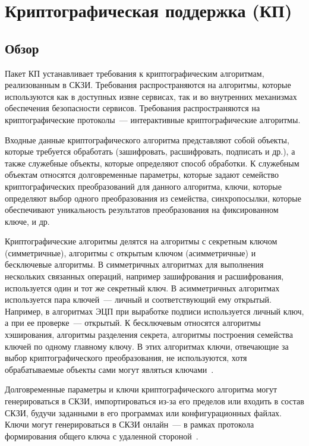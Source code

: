 \section{Криптографическая поддержка (КП)}\label{CS}

\subsection{Обзор}\label{CS.Intro}

Пакет КП устанавливает требования к криптографическим алгоритмам, реализованным
в СКЗИ.
%
Требования распространяются на алгоритмы, которые используются как в доступных
извне сервисах, так и во внутренних механизмах обеспечения безопасности
сервисов.
%
Требования распространяются на криптографические протоколы~---
интерактивные криптографические алгоритмы.

Входные данные криптографического алгоритма представляют собой объекты, которые
требуется обработать (зашифровать, расшифровать, подписать и др.), а также
служебные объекты, которые определяют способ обработки.
%
К служебным объектам относятся долговременные параметры, которые задают
семейство криптографических преобразований для данного алгоритма, ключи, которые
определяют выбор одного преобразования из семейства, синхропосылки, которые
обеспечивают уникальность результатов преобразования на фиксированном ключе, 
и др.

Криптографические алгоритмы делятся на алгоритмы с секретным ключом
(симметричные), алгоритмы с открытым ключом (асимметричные) и бесключевые
алгоритмы.
%
В симметричных алгоритмах для выполнения нескольких связанных операций, например
зашифрования и расшифрования, используется один и тот же секретный ключ.
%
В асимметричных алгоритмах используется пара ключей~--- личный и соответствующий
ему открытый. Например, в алгоритмах ЭЦП при выработке подписи используется
личный ключ, а при ее проверке~--- открытый.
%
К бесключевым относятся алгоритмы хэширования, алгоритмы разделения секрета,
алгоритмы построения семейства ключей по одному главному ключу. В этих
алгоритмах ключи, отвечающие за выбор криптографического преобразования, не
используются, хотя обрабатываемые объекты сами могут являться 
ключами~.

Долговременные параметры и ключи криптографического алгоритма
могут генерироваться в СКЗИ, импортироваться из-за его 
пределов или входить в состав СКЗИ, будучи заданными в его программах или 
конфигурационных файлах.
%
Ключи могут генерироваться в СКЗИ онлайн~--- в рамках протокола 
формирования общего ключа с удаленной стороной~.

